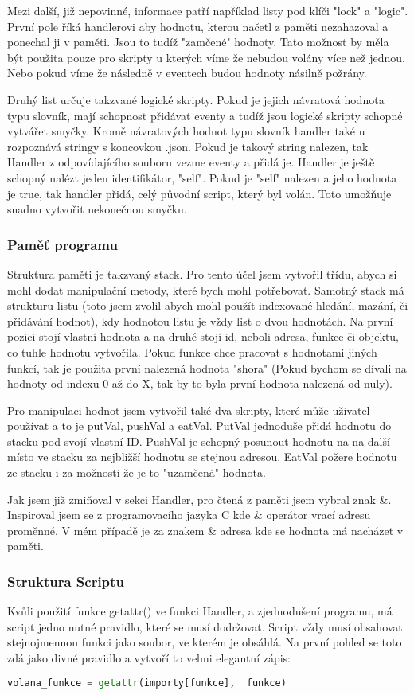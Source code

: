 \documentclass[12pt,a4paper]{article}
\begin{document}
Mezi další, již nepovinné, informace patří například listy pod klíči "lock" a "logic". První pole říká handlerovi aby hodnotu, kterou načetl z paměti nezahazoval a ponechal ji v paměti. Jsou to tudíž "zamčené" hodnoty. Tato možnost by měla být použita pouze pro skripty u kterých víme že nebudou volány více než jednou. Nebo pokud víme že následně v eventech budou hodnoty násilně požrány. 

Druhý list určuje takzvané logické skripty. Pokud je jejich návratová hodnota typu slovník, mají schopnost přidávat eventy a tudíž jsou logické skripty schopné vytvářet smyčky. Kromě návratových hodnot typu slovník handler také u rozpoznává stringy s koncovkou .json. Pokud je takový string nalezen, tak Handler z odpovídajícího souboru vezme eventy a přidá je. Handler je ještě schopný nalézt jeden identifikátor, "self". Pokud je "self" nalezen a jeho hodnota je true, tak handler přidá, celý původní script, který byl volán. Toto umožňuje snadno vytvořit nekonečnou smyčku.
\subsubsection{Paměť programu}
Struktura paměti je takzvaný stack. Pro tento účel jsem vytvořil třídu, abych si mohl dodat manipulační metody, které bych mohl potřebovat. Samotný stack má strukturu listu (toto jsem zvolil abych mohl použít indexované hledání, mazání, či přidávání hodnot), kdy hodnotou listu je vždy list o dvou hodnotách. Na první pozici stojí vlastní hodnota a na druhé stojí id, neboli adresa, funkce či objektu, co tuhle hodnotu vytvořila. Pokud funkce chce pracovat s hodnotami jiných funkcí, tak je použita první nalezená hodnota "shora" (Pokud bychom se dívali na hodnoty od indexu 0 až do X, tak by to byla první hodnota nalezená od nuly).

Pro manipulaci hodnot jsem vytvořil také dva skripty, které může uživatel používat a to je putVal, pushVal a eatVal. PutVal jednoduše přidá hodnotu do stacku pod svojí vlastní ID. PushVal je schopný posunout hodnotu na na další místo ve stacku za nejbližší hodnotu se stejnou adresou. EatVal požere hodnotu ze stacku i za možnosti že je to "uzamčená" hodnota.

Jak jsem již zmiňoval v sekci Handler, pro čtená z paměti jsem vybral znak \&. Inspiroval jsem se z programovacího jazyka C kde \& operátor vrací adresu proměnné. V mém případě je za znakem \& adresa kde se hodnota má nacházet v paměti.
\subsubsection{Struktura Scriptu}
Kvůli použití funkce getattr() ve funkci Handler, a zjednodušení programu, má script jedno nutné
pravidlo, které se musí dodržovat. Script vždy musí obsahovat stejnojmennou funkci jako soubor, ve kterém je obsáhlá. Na první pohled se toto zdá jako divné pravidlo a vytvoří to velmi elegantní zápis: 
\begin{lstlisting}[language=Python] 
volana_funkce = getattr(importy[funkce],  funkce) 
\end{lstlisting}
\end{document}
